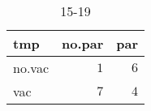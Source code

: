 %
\begin{table}[!tbp]
\caption{15-19\label{15-19}} 
\begin{center}
\begin{tabular}{lrr}
\hline\hline
\multicolumn{1}{l}{tmp}&\multicolumn{1}{c}{no.par}&\multicolumn{1}{c}{par}\tabularnewline
\hline
no.vac&$1$&$6$\tabularnewline
vac&$7$&$4$\tabularnewline
\hline
\end{tabular}
\end{center}
\end{table}

